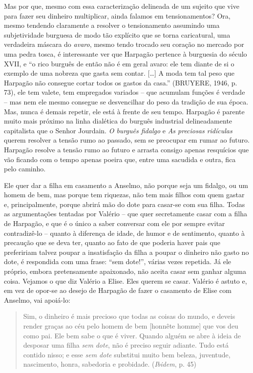 Mas por que, mesmo com essa caracterização delineada de um sujeito que
vive para fazer seu dinheiro multiplicar, ainda falamos em
tensionamentos? Ora, mesmo tendendo claramente a resolver o
tensionamento assumindo uma subjetividade burguesa de modo tão explícito
que se torna caricatural, uma verdadeira máscara do \emph{avaro}, mesmo
tendo trocado seu coração no mercado por uma pedra tosca, é interessante
ver que Harpagão pertence à burguesia do século XVII, e ``o rico burguês
de então não é em geral avaro: ele tem diante de si o exemplo de uma
nobreza que gasta sem contar. {[}\ldots{}{]} A moda tem tal peso que
Harpagão não consegue cortar todos os gastos da casa.'' (BRUYERE, 1946,
p. 73), ele tem valete, tem empregados variados -- que acumulam funções
é verdade -- mas nem ele mesmo consegue se desvencilhar do peso da
tradição de sua época. Mas, nunca é demais repetir, ele está à frente de
seu tempo. Harpagão é parente muito mais próximo na linha dialética do
burguês industrial delineadamente capitalista que o Senhor Jourdain.
\emph{O burguês fidalgo} e \emph{As preciosas ridículas} querem resolver
a tensão rumo ao passado, sem se preocupar em rumar ao futuro. Harpagão
resolve a tensão rumo ao futuro e arrasta consigo apenas resquícios que
vão ficando com o tempo apenas poeira que, entre uma sacudida e outra,
fica pelo caminho.

Ele quer dar a filha em casamento a Anselmo, não porque seja um fidalgo,
ou um homem de bem, mas porque tem riquezas, não tem mais filhos com
quem gastar e, principalmente, porque abrirá mão do dote para casar-se
com sua filha. Todas as argumentações tentadas por Valério -- que quer
secretamente casar com a filha de Harpagão, e que é o único a saber
conversar com ele por sempre evitar contradizê-lo -- quanto à diferença
de idade, de humor e de sentimento, quanto à precaução que se deva ter,
quanto ao fato de que poderia haver pais que prefeririam talvez poupar a
insatisfação da filha a poupar o dinheiro não gasto no dote, é
respondida com uma frase: ``sem dote!'', várias vezes repetida. Já ele
próprio, embora pretensamente apaixonado, não aceita casar sem ganhar
alguma coisa. Vejamos o que diz Valério a Elise. Eles querem se casar.
Valério é astuto e, em vez de opor-se ao desejo de Harpagão de fazer o
casamento de Elise com Anselmo, vai apoiá-lo:

\begin{quote}
Sim, o dinheiro é mais precioso que todas as coisas do mundo, e deveis
render graças ao céu pelo homem de bem {[}honnête homme{]} que vos deu
como pai. Ele bem sabe o que é viver. Quando alguém se abre à ideia de
desposar uma filha \emph{sem} \emph{dote}, não é preciso seguir adiante.
Tudo está contido nisso; e esse \emph{sem dote} substitui muito bem
beleza, juventude, nascimento, honra, sabedoria e probidade.
(\emph{Ibidem}, p. 45)
\end{quote}

